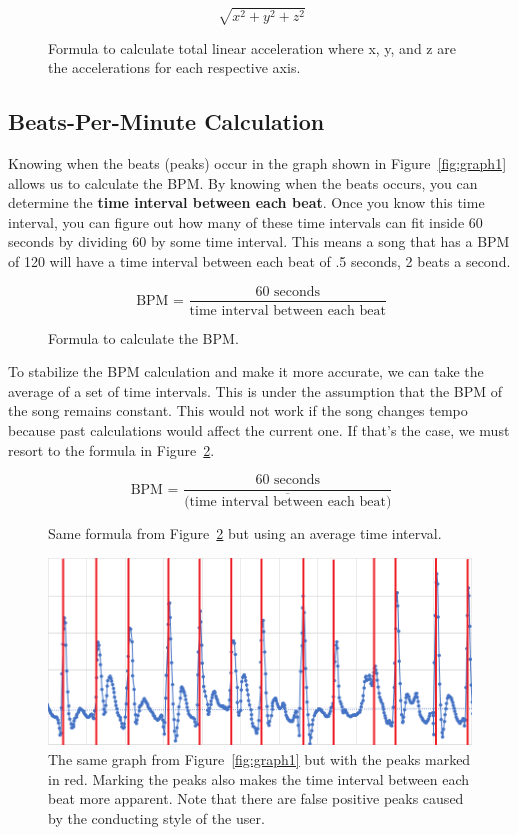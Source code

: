 \documentclass[12pt]{article}
\begin{document}
\begin{figure}[h!]
\[\sqrt[]{x^2 + y^2 + z^2}\]
\caption{Formula to calculate total linear acceleration where x, y, and z are the accelerations for each respective axis.}
\label{TLA}
\end{figure}

\subsection{Beats-Per-Minute Calculation}
Knowing when the beats (peaks) occur in the graph shown in Figure~\ref{fig:graph1} allows us to calculate the BPM. By knowing when the beats occurs, you can determine the \textbf{time interval between each beat}. Once you know this time interval, you can figure out how many of these time intervals can fit inside 60 seconds by dividing 60 by some time interval. This means a song that has a BPM of 120 will have a time interval between each beat of .5 seconds, 2 beats a second. \\

\begin{figure}[h!]
\[\ \text{BPM = }\frac{60 \text{ seconds}}{\text{time interval between each beat}}\]
\caption{Formula to calculate the BPM.}
\label{fig:bpm1}
\end{figure}

To stabilize the BPM calculation and make it more accurate, we can take the average of a set of time intervals. This is under the assumption that the BPM of the song remains constant. This would not work if the song changes tempo because past calculations would affect the current one. If that's the case, we must resort to the formula in Figure~\ref{fig:bpm1}.

\begin{figure}[h!]
\[\ \text{BPM = }\frac{60 \text{ seconds}}{\overline{ \text{(time interval between each beat)} }}\]
\caption{Same formula from Figure~\ref{fig:bpm1} but using an average time interval.}
\label{fig:bpm2}
\end{figure}

\begin{figure}[h!]
\begin{center}
\includegraphics[width=.75\textwidth]{graph2.png}
\caption{The same graph from Figure~\ref{fig:graph1} but with the peaks marked in red. Marking the peaks also makes the time interval between each beat more apparent. Note that there are false positive peaks caused by the conducting style of the user.}
\label{fig:graph}
\end{center}
\end{figure}
\end{document}
